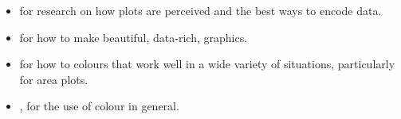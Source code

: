\begin{itemize}
  \item \citet{cleveland:1993,cleveland:1987,cleveland:1994} for research on how plots are perceived and the best ways to encode data.
  \item \citet{tufte:2006,tufte:1990,tufte:1997,tufte:2001} for how to make beautiful, data-rich, graphics.
  \item \citet{brewer:1994,brewer:1994a} for how to colours that work well in a wide variety of situations, particularly for area plots.
  \item \citet{carr:1999,carr:1994,carr:2002}, for the use of colour in general.
\end{itemize}



